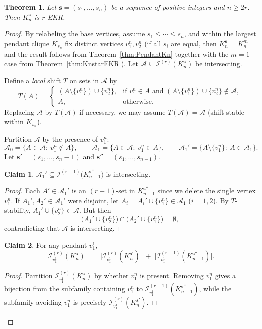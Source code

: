 \documentclass{article}
\newtheorem{theorem}{Theorem}
\theoremstyle{definition}
\newtheorem{claim}{Claim}
\newcommand{\A}{\mathcal{A}}
\newcommand{\s}{\mathbf{s}}
\newcommand{\1}{\mathbf{1}}
\begin{document}
\medskip

\begin{theorem}\label{thm:general-s}
Let $\s=(s_1,\dots,s_n)$ be a sequence of positive integers and $n\ge 2r$. Then $K_n^{\s}$ is $r$-EKR.
\end{theorem}

\begin{proof}
By relabeling the base vertices, assume $s_1\le \cdots \le s_n$, and within the largest pendant clique $K_{s_n}$ fix distinct vertices $v_1^n,v_2^n$ (if all $s_i$ are equal, then $K_n^{\s}=K_n^m$ and the result follows from Theorem~\ref{thm:PendantKn} together with the $m=1$ case from Theorem~\ref{thm:KnstarEKR}). Let $\A\subseteq \mathcal{I}^{(r)}(K_n^{\s})$ be intersecting.



Define a \emph{local} shift $T$ on sets in $\A$ by
\[
T(A)=
\begin{cases}
(A\setminus\{v_1^n\})\cup\{v_2^n\}, &\text{if } v_1^n\in A \text{ and } (A\setminus\{v_1^n\})\cup\{v_2^n\}\notin \A,\\
A,&\text{otherwise}.
\end{cases}
\]
Replacing $\A$ by $T(\A)$ if necessary, we may assume $T(\A)=\A$ (shift-stable within $K_{s_n}$).

Partition $\A$ by the presence of $v_1^n$:
\[
\A_0=\{A\in\A:\ v_1^n\notin A\},\qquad
\A_1=\{A\in\A:\ v_1^n\in A\},\qquad
\A_1'=\{A\setminus\{v_1^n\}:\ A\in\A_1\}.
\]
Let $\s'=(s_1,\dots,s_n-1)$ and $\s''=(s_1,\dots,s_{n-1})$.


\bigskip

\begin{claim}\label{claim:intersectingA1prime}
$\A_1'\subseteq \mathcal{I}^{(r-1)}\!\bigl(K_{n-1}^{\s''}\bigr)$ is intersecting.
\end{claim}
\begin{proof}
Each $A'\in \A_1'$ is an $(r-1)$-set in $K_{n-1}^{\s''}$ since we delete the single vertex $v_1^n$. 
If $A_1',A_2'\in \A_1'$ were disjoint, let $A_i=A_i'\cup\{v_1^n\}\in\A_1$ ($i=1,2$). By $T$-stability, $A_1' \cup\{v_2^n\}\in\A$. But then 
\[
\bigl(A_1'\cup\{v_2^n\}\bigr)\cap \bigl(A_2'\cup\{v_1^n\}\bigr)=\emptyset,
\]
contradicting that $\A$ is intersecting.
\end{proof}


\bigskip

\begin{claim}\label{claim:counting-star-s}
For any pendant $v_1^1$,
\[
\bigl|\mathcal{I}^{(r)}_{v_1^1}(K_n^{\s})\bigr|
\;=\;
\bigl|\mathcal{I}^{(r)}_{v_1^1}(K_n^{\s'} )\bigr|
\;+\;
\bigl|\mathcal{I}^{(r-1)}_{v_1^1}(K_{n-1}^{\s''})\bigr|.
\]
\end{claim}
\begin{proof}
Partition $\mathcal{I}^{(r)}_{v_1^1}(K_n^{\s})$ by whether $v_1^n$ is present. Removing $v_1^n$ gives a bijection from the subfamily containing $v_1^n$ to $\mathcal{I}^{(r-1)}_{v_1^1}(K_{n-1}^{\s''})$, while the subfamily avoiding $v_1^n$ is precisely $\mathcal{I}^{(r)}_{v_1^1}(K_n^{\s'})$.
\end{proof}


\end{proof}
\end{document}
